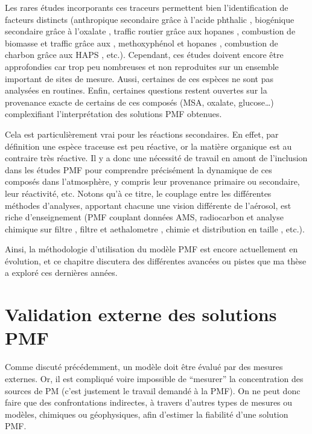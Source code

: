 Les rares études incorporants ces traceurs permettent bien l'identification de facteurs
distincts (anthropique secondaire grâce à l'acide phthalic
\autocite{srivastavaSpeciation2018a}, biogénique secondaire grâce à l'oxalate
\autocite{petitSources2019}, traffic routier grâce aux hopanes
\autocite{srivastavaSpeciation2018a}, combustion de biomasse et traffic grâce aux
, methoxyphénol et hopanes \autocite{chevrierChauffage2016}, combustion de
charbon grâce aux HAPS \autocite{gollyEtude2014}, etc.).
Cependant, ces études doivent encore être approfondies car trop peu nombreuses et non
reproduites sur un ensemble important de sites de mesure. Aussi, certaines de ces espèces ne
sont pas analysées en routines.
Enfin, certaines questions restent ouvertes sur la provenance exacte de certains de ces
composés (MSA, oxalate, glucose…) complexifiant l'interprétation des solutions PMF
obtenues.

Cela est particulièrement vrai pour les réactions secondaires. En effet, par définition
une espèce traceuse est peu réactive, or la matière organique est au contraire très
réactive. Il y a donc une nécessité de travail en amont de l'inclusion dans les études PMF
pour comprendre précisément la dynamique de ces composés dans l'atmosphère, y compris leur
provenance primaire ou secondaire, leur réactivité, etc. 
Notons qu'à ce titre, le couplage entre les différentes méthodes d'analyses, apportant
chacune une vision différente de l'aérosol, est riche d'enseignement (PMF couplant
données AMS, radiocarbon et analyse chimique sur filtre \autocite{vlachouDevelopment2019},
filtre et aethalometre \autocite{chevrierChauffage2016}, chimie et distribution en taille
\autocite{bozzettiSizeResolved2016}, etc.).

Ainsi, la méthodologie d'utilisation du modèle PMF est encore actuellement en évolution,
et ce chapitre discutera des différentes avancées ou pistes que ma thèse a exploré ces
dernières années.

\section{Validation externe des solutions PMF}%
\label{sec:confrontation_des_solutions_pmf}

Comme discuté précédemment, un modèle doit être évalué par des mesures externes. Or, il
est compliqué voire impossible de ``mesurer'' la concentration des sources de PM (c'est
justement le travail demandé à la PMF). On ne peut donc faire que des confrontations
indirectes, à travers d'autres types de mesures ou modèles, chimiques ou géophysiques, afin
d'estimer la fiabilité d'une solution PMF.

